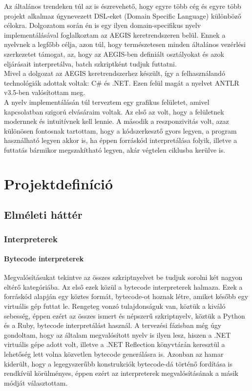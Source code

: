 \documentclass[a4paper,12pt]{report}
\begin{document}
Az általános trendeken túl az is észrevehető, hogy egyre több cég és egyre több projekt alkalmaz úgynevezett DSL-eket (Domain Specific Language\cite{dsl}) különböző célokra. Dolgozatom során én is egy ilyen domain-specifikus nyelv implementálásával foglalkoztam az AEGIS keretrendszeren belül. Ennek a nyelvnek a legfőbb célja, azon túl, hogy természetesen minden általános vezérlési szerkezetet támogat, az, hogy az AEGIS-ben definiált osztályokat és azok eljárásait interpretálva, batch szkriptként tudjuk futtatni.  \\
Mivel a dolgozat az AEGIS keretrendszerhez készült, így a felhasználandó technológiák adottak voltak: C\# és .NET. Ezen felül magát a nyelvet ANTLR\cite{antlr} v3.5-ben valósítottam meg. \\ 

A nyelv implementálásán túl terveztem egy grafikus felületet, amivel kapcsolatban szigorú elvásáraim voltak. Az első az volt, hogy a felületnek modernnek és intuitívnek kell lennie. A második a reszponzivitás volt, azaz különösen fontosnak tartottam, hogy a kódszerkesztő gyors legyen, a program használható legyen akkor is, ha éppen forráskód interpretálása folyik, illetve a futtatás bármikor megszakítható legyen, akár végtelen ciklusba kerülve is. \\



\chapter{Projektdefiníció}
\section{Elméleti háttér}
\subsection{Interpreterek}


\subsubsection{Bytecode interpreterek}
Megvalósításukat tekintve az összes szkriptnyelvet be tudjuk sorolni két nagyon eltérő kategóriába. Az első ezek közül a bytecode interpreterek halmaza. Ezek a forráskód alapján egy köztes formát, bytecode-ot hoznak létre, amiket később egy virtuális gép futtat le. Rengeteg vonzó tulajdonságuk van, köztük a kiváló sebesség, éppen ezért az összes ismert és népszerű szkriptnyelv, köztük a Python és a Ruby, bytecode interpretálást használ. A tervezési fázisban még úgy gondoltam, hogy az általam megvalósított nyelv is ilyen lesz, hiszen a .NET virtuális gépe adott volt, illetve a .NET Reflection könyvtárán keresztül a lehetőség lett volna közvetlen bytecode generálásra is. Azonban az hamar kiderült, hogy a legegyszerűbb konstrukciók bytecode-dá történő fordítása is rendkívül körülményes, éppen ezért az interpreterek megvalósításának a másik módját választottam.
\end{document}
